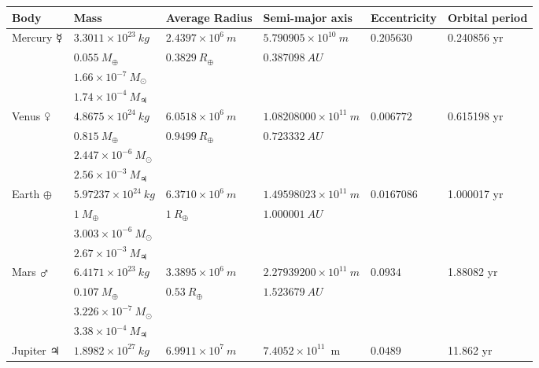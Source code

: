 \documentclass[]{report}
\begin{document}
\def\arraystretch{1.1}
\begin{tabular}{ |l|l|l|l|l|l| } 
\hline
\textbf{Body}		& \textbf{Mass}						& \textbf{Average Radius} 	& \textbf{Semi-major axis} 		& \textbf{Eccentricity}	& \textbf{Orbital period} \\ 
\hline
Mercury $\mercury$	& $3.3011 \times 10^{23}\ kg$		& $2.4397 \times 10^6\ m$	& $5.790905 \times 10^{10}\ m$	& $	0.205 630$			& 0.240856 yr\\
					& $0.055\ M_\oplus $				& $0.3829\ R_\oplus$		& $0.387098\ AU$				&						& 			\\
                	& $1.66 \times 10^{-7}\ M_{\odot}$ 	&							&								&						&			\\
					& $1.74\times 10^{-4}\ M_{\jupiter}$&							&								&						&			\\
\hline
Venus $\venus$		& $4.8675 \times 10^{24}\ kg$		& $6.0518 \times 10^6\ m$	& $1.08208000 \times 10^{11}\ m$	& $0.006772$		& 0.615198 yr\\
					& $0.815\ M_\oplus $				& $0.9499\ R_\oplus$		& $0.723332\ AU$					&						& 			\\
                	& $2.447 \times 10^{-6}\ M_{\odot}$ &							&								&						&			\\
                    & $2.56\times 10^{-3}\ M_{\jupiter}$&							&								&						&			\\
\hline
Earth $\oplus$	 	& $5.97237 \times 10^{24}\ kg$		& $6.3710 \times 10^6\ m$	& $1.49598023 \times 10^{11}\ m$& $0.0167086$			& 1.000017 yr\\
					& $1\ M_\oplus $					& $1\ R_\oplus$				& $1.000001\ AU$				&						&			\\
                	& $3.003 \times 10^{-6}\ M_{\odot}$ &							&								&						&			\\
                    & $2.67\times 10^{-3}\ M_{\jupiter}$&							&								&						&			\\
\hline
Mars $\mars$ 		& $6.4171 \times 10^{23}\ kg$		& $3.3895 \times 10^6\ m$	& $2.27939200 \times 10^{11}\ m$& $0.0934$				& 1.88082 yr\\
					& $0.107\ M_\oplus $				& $0.53\ R_\oplus$			& $1.523679\ AU$				&						&			\\
                	& $3.226 \times 10^{-7}\ M_{\odot}$ &							&								&						&			\\
                    & $3.38\times 10^{-4}\ M_{\jupiter}$&							&								&						&			\\
\hline
Jupiter $\jupiter$	& $1.8982 \times 10^{27}\ kg$		& $6.9911 \times 10^7\ m$	& $7.4052 \times 10^{11}$\ m	& $0.0489$				& 11.862 yr	\\

\end{tabular}
\end{document}
